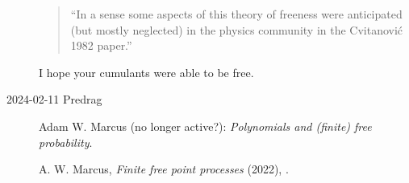 \begin{description}
\begin{quote}
``In a sense some aspects of this theory of freeness were anticipated
(but mostly neglected) in the physics community in the Cvitanovi\'c 1982
paper.''
\end{quote}

I hope your cumulants were able to be free.


   \item[2024-02-11 Predrag]
{Adam W. Marcus} (no longer active?):
{{\em Polynomials and (finite) free probability}}.

A. W. Marcus, {\em Finite free point processes} (2022),
.


\end{description}


\printbibliography[heading=subbibintoc,title={References}]
